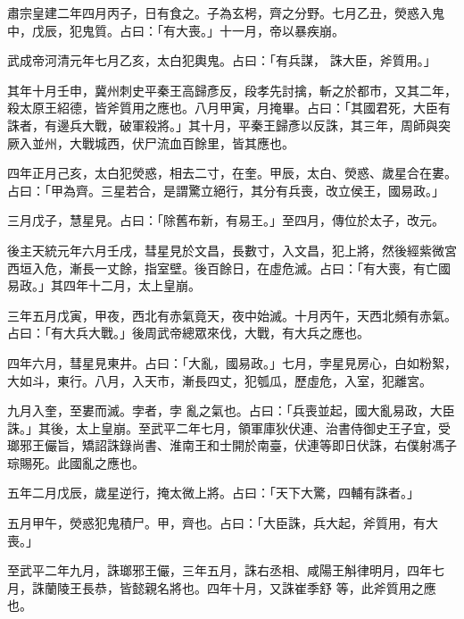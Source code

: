 \begin{pinyinscope}
 肅宗皇建二年四月丙子，日有食之。子為玄枵，齊之分野。七月乙丑，熒惑入鬼中，戊辰，犯鬼質。占曰：「有大喪。」十一月，帝以暴疾崩。



 武成帝河清元年七月乙亥，太白犯輿鬼。占曰：「有兵謀，
 誅大臣，斧質用。」



 其年十月壬申，冀州刺史平秦王高歸彥反，段孝先討擒，斬之於都市，又其二年，殺太原王紹德，皆斧質用之應也。八月甲寅，月掩畢。占曰：「其國君死，大臣有誅者，有邊兵大戰，破軍殺將。」其十月，平秦王歸彥以反誅，其三年，周師與突厥入並州，大戰城西，伏尸流血百餘里，皆其應也。



 四年正月己亥，太白犯熒惑，相去二寸，在奎。甲辰，太白、熒惑、歲星合在婁。占曰：「甲為齊。三星若合，是謂驚立絕行，其分有兵喪，改立侯王，國易政。」



 三月戊子，慧星見。占曰：「除舊布新，有易王。」至四月，傳位於太子，改元。



 後主天統元年六月壬戌，彗星見於文昌，長數寸，入文昌，犯上將，然後經紫微宮西垣入危，漸長一丈餘，指室壁。後百餘日，在虛危滅。占曰：「有大喪，有亡國易政。」其四年十二月，太上皇崩。



 三年五月戊寅，甲夜，西北有赤氣竟天，夜中始滅。十月丙午，天西北頻有赤氣。占曰：「有大兵大戰。」後周武帝總眾來伐，大戰，有大兵之應也。



 四年六月，彗星見東井。占曰：「大亂，國易政。」七月，孛星見房心，白如粉絮，大如斗，東行。八月，入天市，漸長四丈，犯瓠瓜，歷虛危，入室，犯離宮。



 九月入奎，至婁而滅。孛者，孛
 亂之氣也。占曰：「兵喪並起，國大亂易政，大臣誅。」其後，太上皇崩。至武平二年七月，領軍庫狄伏連、治書侍御史王子宜，受瑯邪王儼旨，矯詔誅錄尚書、淮南王和士開於南臺，伏連等即日伏誅，右僕射馮子琮賜死。此國亂之應也。



 五年二月戊辰，歲星逆行，掩太微上將。占曰：「天下大驚，四輔有誅者。」



 五月甲午，熒惑犯鬼積尸。甲，齊也。占曰：「大臣誅，兵大起，斧質用，有大喪。」



 至武平二年九月，誅瑯邪王儼，三年五月，誅右丞相、咸陽王斛律明月，四年七月，誅蘭陵王長恭，皆懿親名將也。四年十月，又誅崔季舒
 等，此斧質用之應也。




\end{pinyinscope}
